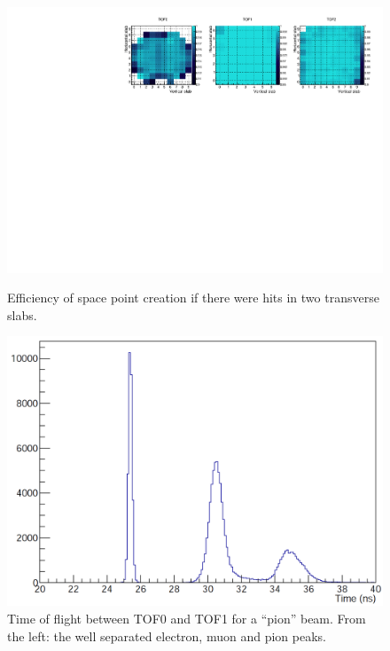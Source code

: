 \begin{figure}[!htb]
  \begin{center}
  \includegraphics[width=0.9\columnwidth]{08_sp_eff_by_pixel_2d} \\
  \caption{Efficiency of space point creation if there were hits in
    two transverse slabs.}
  \label{fig:SpEffByPixel}
  \end{center}
\end{figure}


\begin{figure}[!htb]
  \begin{center}
    \includegraphics[width=0.6\columnwidth]{TOF_peaks.png}
    \caption{Time of flight between TOF0 and TOF1 for a ``pion'' beam. From the left: the well separated electron, muon and pion peaks.}
    \label{fig:TOF_peaks}
  \end{center}
\end{figure}



